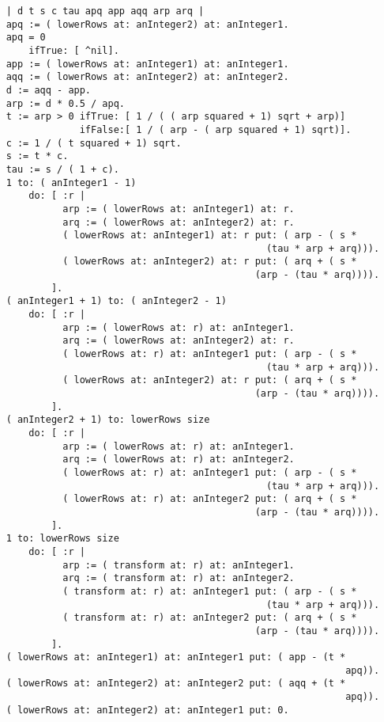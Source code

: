 \begin{verbatim}
    | d t s c tau apq app aqq arp arq |
    apq := ( lowerRows at: anInteger2) at: anInteger1.
    apq = 0
        ifTrue: [ ^nil].
    app := ( lowerRows at: anInteger1) at: anInteger1.
    aqq := ( lowerRows at: anInteger2) at: anInteger2.
    d := aqq - app.
    arp := d * 0.5 / apq.
    t := arp > 0 ifTrue: [ 1 / ( ( arp squared + 1) sqrt + arp)]
                 ifFalse:[ 1 / ( arp - ( arp squared + 1) sqrt)].
    c := 1 / ( t squared + 1) sqrt.
    s := t * c.
    tau := s / ( 1 + c).
    1 to: ( anInteger1 - 1)
        do: [ :r |
              arp := ( lowerRows at: anInteger1) at: r.
              arq := ( lowerRows at: anInteger2) at: r.
              ( lowerRows at: anInteger1) at: r put: ( arp - ( s * 
                                                  (tau * arp + arq))).
              ( lowerRows at: anInteger2) at: r put: ( arq + ( s * 
                                                (arp - (tau * arq)))).
            ].
    ( anInteger1 + 1) to: ( anInteger2 - 1)
        do: [ :r |
              arp := ( lowerRows at: r) at: anInteger1.
              arq := ( lowerRows at: anInteger2) at: r.
              ( lowerRows at: r) at: anInteger1 put: ( arp - ( s * 
                                                  (tau * arp + arq))).
              ( lowerRows at: anInteger2) at: r put: ( arq + ( s * 
                                                (arp - (tau * arq)))).
            ].
    ( anInteger2 + 1) to: lowerRows size
        do: [ :r |
              arp := ( lowerRows at: r) at: anInteger1.
              arq := ( lowerRows at: r) at: anInteger2.
              ( lowerRows at: r) at: anInteger1 put: ( arp - ( s * 
                                                  (tau * arp + arq))).
              ( lowerRows at: r) at: anInteger2 put: ( arq + ( s * 
                                                (arp - (tau * arq)))).
            ].
    1 to: lowerRows size
        do: [ :r |
              arp := ( transform at: r) at: anInteger1.
              arq := ( transform at: r) at: anInteger2.
              ( transform at: r) at: anInteger1 put: ( arp - ( s * 
                                                  (tau * arp + arq))).
              ( transform at: r) at: anInteger2 put: ( arq + ( s * 
                                                (arp - (tau * arq)))).
            ].
    ( lowerRows at: anInteger1) at: anInteger1 put: ( app - (t * 
                                                                apq)).
    ( lowerRows at: anInteger2) at: anInteger2 put: ( aqq + (t * 
                                                                apq)).
    ( lowerRows at: anInteger2) at: anInteger1 put: 0.

\end{verbatim}

